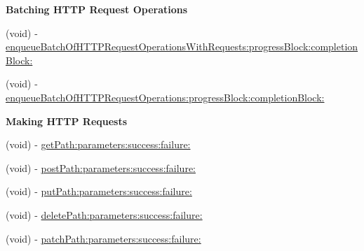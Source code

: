 \begin{Indent}{\bf Batching H\-T\-T\-P Request Operations}\par
{\em 

 

 }\begin{DoxyCompactItemize}
\item 
(void) -\/ \hyperlink{interface_a_f_h_t_t_p_client_a48cd4d116df1c59803fcdc940c81bdb5}{enqueue\-Batch\-Of\-H\-T\-T\-P\-Request\-Operations\-With\-Requests\-:progress\-Block\-:completion\-Block\-:}
\item 
(void) -\/ \hyperlink{interface_a_f_h_t_t_p_client_a88a299f95a905c0965efa304b41592f6}{enqueue\-Batch\-Of\-H\-T\-T\-P\-Request\-Operations\-:progress\-Block\-:completion\-Block\-:}
\end{DoxyCompactItemize}
\end{Indent}
\begin{Indent}{\bf Making H\-T\-T\-P Requests}\par
{\em 

 

 }\begin{DoxyCompactItemize}
\item 
(void) -\/ \hyperlink{interface_a_f_h_t_t_p_client_a42c73e3951312bed6a19e296b84605f2}{get\-Path\-:parameters\-:success\-:failure\-:}
\item 
(void) -\/ \hyperlink{interface_a_f_h_t_t_p_client_ab36149260e547f38ef32d21bdd39d18f}{post\-Path\-:parameters\-:success\-:failure\-:}
\item 
(void) -\/ \hyperlink{interface_a_f_h_t_t_p_client_a1e9b528834603c0113b090f222906674}{put\-Path\-:parameters\-:success\-:failure\-:}
\item 
(void) -\/ \hyperlink{interface_a_f_h_t_t_p_client_a51eb3cefc76d9e9fc46959779099e965}{delete\-Path\-:parameters\-:success\-:failure\-:}
\item 
(void) -\/ \hyperlink{interface_a_f_h_t_t_p_client_ab2ef370382a47e4072d81ca937bec469}{patch\-Path\-:parameters\-:success\-:failure\-:}
\end{DoxyCompactItemize}
\end{Indent}
